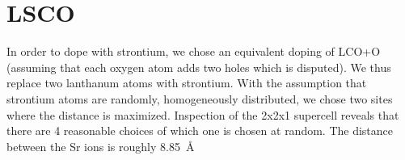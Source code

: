 \section{LSCO}

In order to dope with strontium, we chose an equivalent doping of LCO+O (assuming that each oxygen atom adds two holes which is disputed). We thus replace two lanthanum atoms with strontium. With the assumption that strontium atoms are randomly, homogeneously distributed, we chose two sites where the distance is maximized. Inspection of the 2x2x1 supercell reveals that there are 4 reasonable choices of which one is chosen at random. The distance between the Sr ions is roughly \SI{8.85}{\angstrom}
